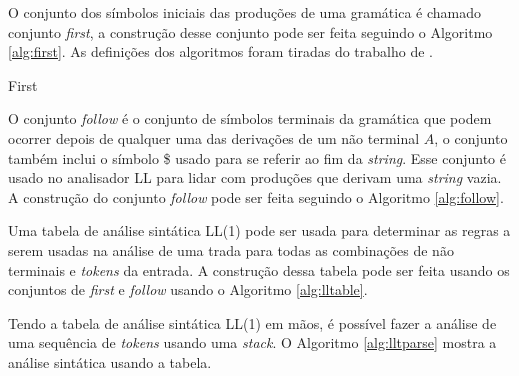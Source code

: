 O conjunto dos símbolos iniciais das produções de uma gramática é chamado conjunto \textit{first}, a construção desse conjunto pode ser feita seguindo o Algoritmo \ref{alg:first}. As definições dos algoritmos foram tiradas do trabalho de \textcite{thain2020introduction}.

\DontPrintSemicolon
{}
\begin{algorithm}[htp]
    \caption{First}\label{alg:first}
\end{algorithm}

O conjunto \textit{follow} é o conjunto de símbolos terminais da gramática que podem ocorrer depois de qualquer uma das derivações de um não terminal $A$, o conjunto também inclui o símbolo \$ usado para se referir ao fim da \textit{string}. Esse conjunto é usado no analisador LL para lidar com produções que derivam uma \textit{string} vazia. A construção do conjunto \textit{follow} pode ser feita seguindo o Algoritmo \ref{alg:follow}.

Uma tabela de análise sintática LL(1) pode ser usada para determinar as regras a serem usadas na análise de uma trada para todas as combinações de não terminais e \textit{tokens} da entrada. A construção dessa tabela pode ser feita usando os conjuntos de \textit{first} e \textit{follow} usando o Algoritmo \ref{alg:lltable}.

Tendo a tabela de análise sintática LL(1) em mãos, é possível fazer a análise de uma sequência de \textit{tokens} usando uma \textit{stack}. O Algoritmo \ref{alg:lltparse} mostra a análise sintática usando a tabela.

